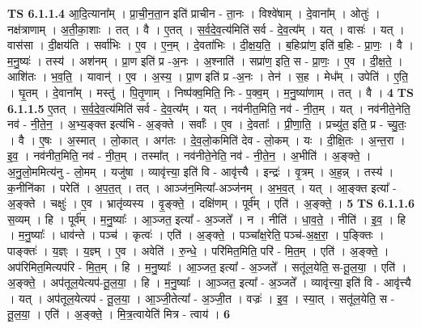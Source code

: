 \documentclass[17pt]{extarticle}
\begin{document}
                  \newline
                                \textbf{ TS 6.1.1.4} \newline
                  आ॒दि॒त्याना᳚म् । प्रा॒ची॒न॒ता॒न इति॑ प्राचीन - ता॒नः । विश्वे॑षाम् । दे॒वाना᳚म् । ओतुः॑ । नक्ष॑त्राणाम् । अ॒ती॒का॒शाः । तत् । वै । ए॒तत् । स॒र्व॒दे॒व॒त्य॑मिति॑ सर्व - दे॒व॒त्य᳚म् । यत् । वासः॑ । यत् । वास॑सा । दी॒क्षय॑ति । सर्वा॑भिः । ए॒व । ए॒न॒म् । दे॒वता॑भिः । दी॒क्ष॒य॒ति॒ । ब॒हिःप्रा॑ण॒ इति॑ ब॒हिः - प्रा॒णः॒ । वै । म॒नु॒ष्यः॑ । तस्य॑ । अश॑नम् । प्रा॒ण इति॑ प्र -अ॒नः । अ॒श्नाति॑ । सप्रा॑ण॒ इति॒ स - प्रा॒णः॒ । ए॒व । दी॒क्ष॒ते॒ । आशि॑तः । भ॒व॒ति॒ । यावान्॑ । ए॒व । अ॒स्य॒ । प्रा॒ण इति॑ प्र -अ॒नः । तेन॑ । स॒ह । मेध᳚म् । उपेति॑ । ए॒ति॒ । घृ॒तम् । दे॒वाना᳚म् । मस्तु॑ । पि॒तृ॒णाम् । निष्प॑क्व॒मिति॒ निः - प॒क्व॒म् । म॒नु॒ष्या॑णाम् । तत् । वै । \textbf{  4} \newline
                  \newline
                                \textbf{ TS 6.1.1.5} \newline
                  ए॒तत् । स॒र्व॒दे॒व॒त्य॑मिति॑ सर्व - दे॒व॒त्य᳚म् । यत् । नव॑नीत॒मिति॒ नव॑ - नी॒त॒म् । यत् । नव॑नीते॒नेति॒ नव॑ - नी॒ते॒न॒ । अ॒भ्य॒ङ्क्त इत्य॑भि - अ॒ङ्क्ते । सर्वाः᳚ । ए॒व । दे॒वताः᳚ । प्री॒णा॒ति॒ । प्रच्यु॑त॒ इति॒ प्र - च्यु॒तः॒ । वै । ए॒षः । अ॒स्मात् । लो॒कात् । अग॑तः । दे॒व॒लो॒कमिति॑ देव - लो॒कम् । यः । दी॒क्षि॒तः । अ॒न्त॒रा । इ॒व॒ । नव॑नीत॒मिति॒ नव॑ - नी॒त॒म् । तस्मा᳚त् । नव॑नीते॒नेति॒ नव॑ - नी॒ते॒न॒ । अ॒भीति॑ । अ॒ङ्क्ते॒ । अ॒नु॒लो॒ममित्य॑नु - लो॒मम् । यजु॑षा । व्यावृ॑त्त्या॒ इति॑ वि - आवृ॑त्त्यै । इन्द्रः॑ । वृ॒त्रम् । अ॒ह॒न्न् । तस्य॑ । क॒नीनि॑का । परेति॑ । अ॒प॒त॒त् । तत् । आञ्ज॑न॒मित्या᳚-अञ्ज॑नम् । अ॒भ॒व॒त् । यत् । आ॒ङ्क्त इत्या᳚ - अ॒ङ्क्ते । चक्षुः॑ । ए॒व । भ्रातृ॑व्यस्य । वृ॒ङ्क्ते॒ । दक्षि॑णम् । पूर्व᳚म् । एति॑ । अ॒ङ्क्ते॒ । \textbf{  5} \newline
                  \newline
                                \textbf{ TS 6.1.1.6} \newline
                  स॒व्यम् । हि । पूर्व᳚म् । म॒नु॒ष्याः᳚ । आ॒ञ्जत॒ इत्या᳚ - अ॒ञ्जते᳚ । न । नीति॑ । धा॒व॒ते॒ । नीति॑ । इ॒व॒ । हि । म॒नु॒ष्याः᳚ । धाव॑न्ते । पञ्च॑ । कृत्वः॑ । एति॑ । अ॒ङ्क्ते॒ । पञ्चा᳚क्ष॒रेति॒ पञ्च॑-अ॒क्ष॒रा॒ । प॒ङ्क्तिः । पाङ्क्तः॑ । य॒ज्ञ्ः । य॒ज्ञ्म् । ए॒व । अवेति॑ । रु॒न्धे॒ । परि॑मित॒मिति॒ परि॑ - मि॒त॒म् । एति॑ । अ॒ङ्क्ते॒ । अप॑रिमित॒मित्यप॑रि - मि॒त॒म् । हि । म॒नु॒ष्याः᳚ । आ॒ञ्जत॒ इत्या᳚ - अ॒ञ्जते᳚ । सतू॑ल॒येति॒ स-तू॒ल॒या॒ । एति॑ । अ॒ङ्क्ते॒ । अप॑तूल॒येत्यप॑-तू॒ल॒या॒ । हि । म॒नु॒ष्याः᳚ । आ॒ञ्जत॒ इत्या᳚ - अ॒ञ्जते᳚ । व्यावृ॑त्त्या॒ इति॑ वि - आवृ॑त्त्यै । यत् । अप॑तूल॒येत्यप॑ - तू॒ल॒या॒ । आ॒ञ्जी॒तेत्या᳚ - अ॒ञ्जी॒त । वज्रः॑ । इ॒व॒ । स्या॒त् । सतू॑ल॒येति॒ स - तू॒ल॒या॒ । एति॑ । अ॒ङ्क्ते॒ । मि॒त्र॒त्वायेति॑ मित्र - त्वाय॑ । \textbf{  6} \newline
\end{document}
